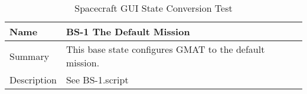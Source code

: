 \begin{table}[htbp!]
\centering
      \begin{tabular}{|p{1.05 in} |p{4.75 in} |}
      \hline
         \rowcolor[rgb]{0.8,0.8,0.8} Name & BS-1 The Default Mission\\
         \hline
         Summary &
         This base state configures GMAT to the default mission.
         \\ \hline
         Description &
         See BS-1.script
         \\ \hline
\end{tabular}
      \label{Table: BS-1}
      \caption{Spacecraft GUI State Conversion Test}
\end{table}

